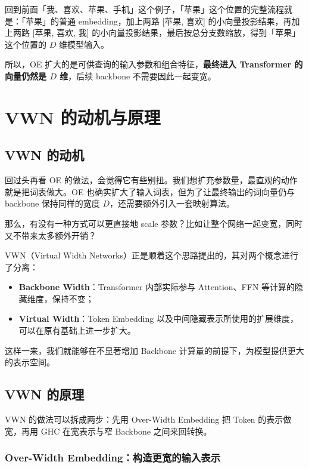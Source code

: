 \documentclass[11pt]{article}
\begin{document}
回到前面「我、喜欢、苹果、手机」这个例子，「苹果」这个位置的完整流程就是：「苹果」的普通 embedding，加上两路 [苹果, 喜欢] 的小向量投影结果，再加上两路 [苹果, 喜欢, 我] 的小向量投影结果，最后按总分支数缩放，得到「苹果」这个位置的 $D$ 维模型输入。

所以，OE 扩大的是可供查询的输入参数和组合特征，\textbf{最终进入 Transformer 的向量仍然是 $D$ 维}，后续 backbone 不需要因此一起变宽。

\section{VWN 的动机与原理}

\subsection{VWN 的动机}

回过头再看 OE 的做法，会觉得它有些别扭。我们想扩充参数量，最直观的动作就是把词表做大。OE 也确实扩大了输入词表，但为了让最终输出的词向量仍与 backbone 保持同样的宽度 $D$，还需要额外引入一套映射算法。

那么，有没有一种方式可以更直接地 scale 参数？比如让整个网络一起变宽，同时又不带来太多额外开销？

VWN（Virtual Width Networks）正是顺着这个思路提出的，其对两个概念进行了分离：

\begin{itemize}
  \item \textbf{Backbone Width}：Transformer 内部实际参与 Attention、FFN 等计算的隐藏维度，保持不变；
  \item \textbf{Virtual Width}：Token Embedding 以及中间隐藏表示所使用的扩展维度，可以在原有基础上进一步扩大。
\end{itemize}

这样一来，我们就能够在不显著增加 Backbone 计算量的前提下，为模型提供更大的表示空间。

\subsection{VWN 的原理}

VWN 的做法可以拆成两步：先用 Over-Width Embedding 把 Token 的表示做宽，再用 GHC 在宽表示与窄 Backbone 之间来回转换。

\subsubsection{Over-Width Embedding：构造更宽的输入表示}
\end{document}
